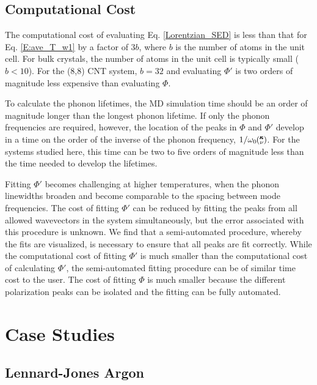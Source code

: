 \documentclass[12pt,twocolumn,iop]{/usr/share/texmf-texlive/tex/latex/iop/iopart}[/usr/share/texmf-texlive/tex/latex/iop/]
\newcommand{\kv}{\mspace{-4.0mu}\left(\mspace{-8.0mu}\begin{smallmatrix}&\pmb{\kappa} \\&\nu\end{smallmatrix}\mspace{-3.0mu}\right)}
\begin{document}
\subsection{\label{Subsection_Comp_Details_4}Computational Cost}

The computational cost of evaluating Eq. \eqref{Lorentzian_SED} is less than that for Eq$.$ \eqref{E:ave_T_w1} by a factor of $3b$, where $b$ is the number of atoms in the unit cell.  For bulk crystals, the number of atoms in the unit cell is typically small ($b<10$).  For the (8,8) CNT system, $b=32$ and evaluating $\Phi'$ is two orders of magnitude less expensive than evaluating $\Phi$.

To calculate the phonon lifetimes, the MD simulation time should be an order of magnitude longer than the longest phonon lifetime.\cite{thomasthesis}  If only the phonon frequencies are required, however, the location of the peaks in $\Phi$ and $\Phi'$ develop in a time on the order of the inverse of the phonon frequency, $1/\omega_0\kv$. For the systems studied here, this time can be two to five orders of magnitude less than the time needed to develop the lifetimes.

Fitting $\Phi'$ becomes challenging at higher temperatures, when the phonon linewidths broaden and become comparable to the spacing between mode frequencies. The cost of fitting $\Phi'$ can be reduced by fitting the peaks from all allowed wavevectors in the system simultaneously, but the error associated with this procedure is unknown.\cite{shiomi2011a} We find that a semi-automated procedure, whereby the fits are visualized, is necessary to ensure that all peaks are fit correctly.  While the computational cost of fitting $\Phi'$ is much smaller than the computational cost of calculating $\Phi'$, the semi-automated fitting procedure can be of similar time cost to the user. The cost of fitting $\Phi$ is much smaller because the different polarization peaks can be isolated and the fitting can be fully automated.

\section{\label{S:Section_Prop}Case Studies}

\subsection{\label{S:Subsection_prop_LJ}Lennard-Jones Argon}
\end{document}
